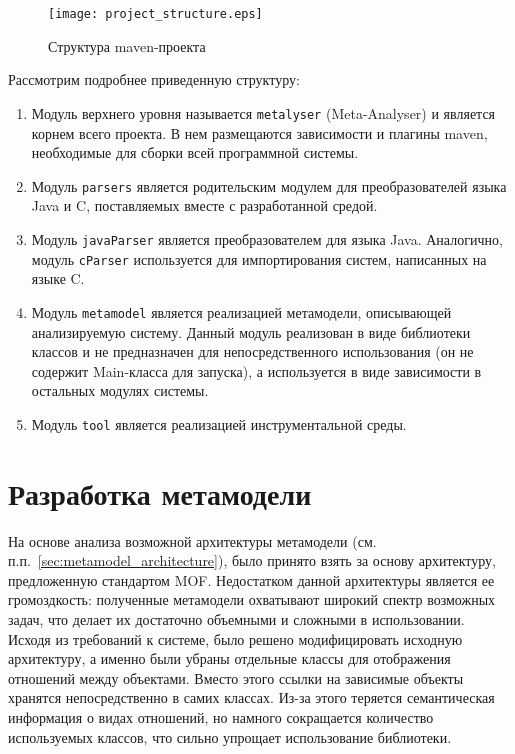 \begin{figure}[ht]
    \begin{center}
        \texttt{[image: project\_structure.eps]}
    \end{center}
    \caption{Структура maven-проекта}
    \label{fig:project_structure}
\end{figure}

Рассмотрим подробнее приведенную структуру:

\begin{enumerate}
    \item Модуль верхнего уровня называется \texttt{metalyser} (Meta-Analyser) и
    является корнем всего проекта. В нем размещаются зависимости и плагины maven,
    необходимые для сборки всей программной системы.
    \item Модуль \texttt{parsers} является родительским модулем для
    преобразователей языка Java и C, поставляемых вместе с разработанной средой.
    \item Модуль \texttt{javaParser} является преобразователем для языка Java.
    Аналогично, модуль \texttt{cParser} используется для импортирования систем,
    написанных на языке C.
    \item Модуль \texttt{metamodel} является реализацией метамодели,
    описывающей анализируемую систему. Данный модуль реализован в виде
    библиотеки классов и не предназначен для непосредственного использования
    (он не содержит Main-класса для запуска), а используется в виде зависимости
    в остальных модулях системы.
    \item Модуль \texttt{tool} является реализацией инструментальной среды.
\end{enumerate}

\section{Разработка метамодели}

На основе анализа возможной архитектуры метамодели (см.
п.п.~\ref{sec:metamodel_architecture}), было принято взять за основу
архитектуру, предложенную стандартом MOF. Недостатком данной архитектуры
является ее громоздкость: полученные метамодели охватывают широкий спектр
возможных задач, что делает их достаточно объемными и сложными в использовании.
Исходя из требований к системе, было решено модифицировать исходную архитектуру,
а именно были убраны отдельные классы для отображения отношений между объектами.
Вместо этого ссылки на зависимые объекты хранятся непосредственно в самих
классах. Из-за этого теряется семантическая информация о видах отношений, но
намного сокращается количество используемых классов, что сильно упрощает
использование библиотеки.

